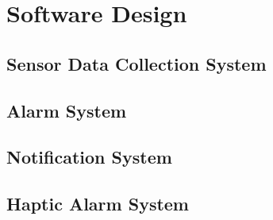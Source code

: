\section{Software Design}

\subsection{Sensor Data Collection System}

\subsection{Alarm System}

\subsection{Notification System}

\subsection{Haptic Alarm System}
